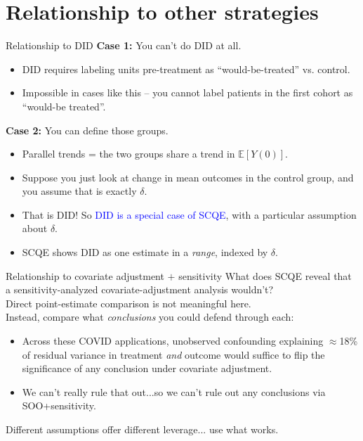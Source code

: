 \documentclass[xcolor=dvipsnames]{beamer}
\newcommand\E{\mathbb{E}}
\begin{document}
\section{Relationship to other strategies}

\begin{frame}{Relationship to DID}
\textbf{Case 1:} You can't do DID at all.\\
\small
\begin{itemize}
    \item DID requires labeling units pre-treatment as ``would-be-treated'' vs. control.
    \item Impossible in cases like this -- you cannot label patients in the first cohort as ``would-be treated''.
\end{itemize}
\medskip
\normalsize
{} \textbf{Case 2:} You can define those groups.\\
\small
\begin{itemize}
    \item Parallel trends = the two groups share a trend in $\E[Y(0)]$.
    \item  Suppose you just look at change in mean outcomes in the control group, and you assume that is exactly $\delta$.  
    \item That is DID! So \textcolor{blue}{DID is a special case of SCQE}, with a particular assumption about $\delta$.
    \item SCQE shows DID as one estimate in a \emph{range}, indexed by $\delta$.
\end{itemize}
\end{frame}

\begin{frame}{Relationship to covariate adjustment $+$ sensitivity}
\small
{} What does SCQE reveal that a sensitivity-analyzed covariate-adjustment analysis wouldn't?\\
\bigskip
{} Direct point-estimate comparison is not meaningful here.\\
\bigskip
{} Instead, compare what \emph{conclusions} you could defend through each:
\begin{itemize}
\item<4-> Across these COVID applications, unobserved confounding explaining $\approx$18\% of residual variance in treatment \emph{and} outcome would suffice to flip the significance of any conclusion under covariate adjustment.
\item<5-> We can't really rule that out...so we can't rule out any conclusions via SOO+sensitivity.
\end{itemize}
\bigskip
{} Different assumptions offer different leverage... use what works.
\end{frame}
\end{document}
